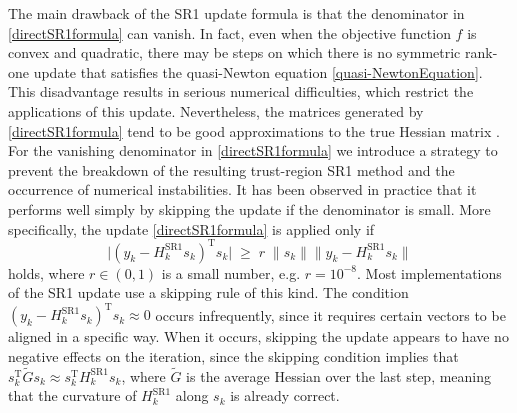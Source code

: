 The main drawback of the SR1 update formula is that the denominator in \cref{directSR1formula} can vanish. In fact, even when the objective function $f$ is convex and quadratic, there may be steps on which there is no symmetric rank-one update that satisfies the quasi-Newton equation \cref{quasi-NewtonEquation}. This disadvantage results in serious numerical difficulties, which restrict the applications of this update. Nevertheless, the matrices generated by \cref{directSR1formula} tend to be good approximations to the true Hessian matrix \cite[p.~145]{NocedalWright:2006}. \\
For the vanishing denominator in \cref{directSR1formula} we introduce a strategy to prevent the breakdown of the resulting trust-region SR1 method and the occurrence of numerical instabilities. It has been observed in practice that it performs well simply by skipping the update if the denominator is small. More specifically, the update \cref{directSR1formula} is applied only if 
\begin{equation}\label{safeguard}
    \lvert (y_k - H^\mathrm{SR1}_k s_k)^{\mathrm{T}} s_k \lvert \; \geq \; r \; \lVert s_k \rVert \lVert y_k - H^\mathrm{SR1}_k s_k \rVert 
\end{equation}
holds, where $r \in (0, 1)$ is a small number, e.g. $r = 10^{−8}$. Most implementations of the SR1 update use a skipping rule of this kind. The condition $(y_k - H^\mathrm{SR1}_k s_k)^{\mathrm{T}} s_k \approx 0$ occurs infrequently, since it requires certain vectors to be aligned in a specific way. When it occurs, skipping the update appears to have no negative effects on the iteration, since the skipping condition implies that $s^{\mathrm{T}}_k \tilde{G} s_k \approx s^{\mathrm{T}}_k H^\mathrm{SR1}_k s_k$, where $\tilde{G}$ is the average Hessian over the last step, meaning that the curvature of $H^\mathrm{SR1}_k$ along $s_k$ is already correct. \\

